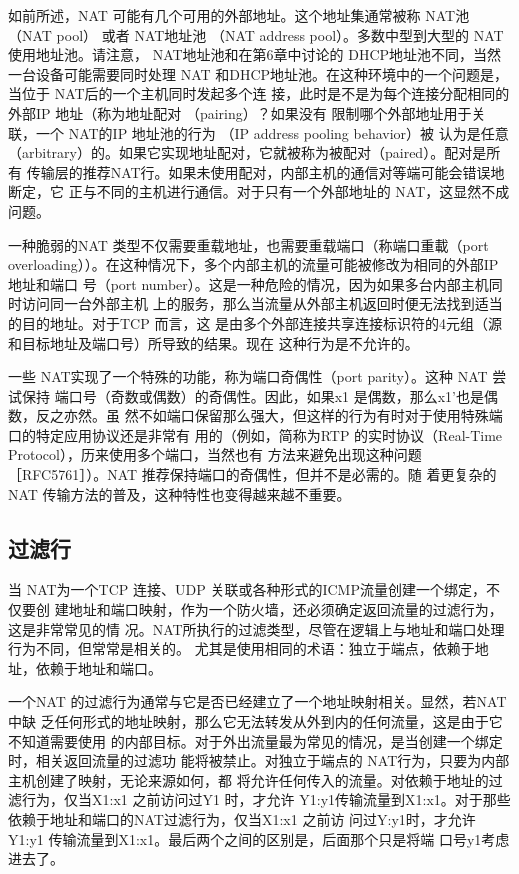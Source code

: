 如前所述，NAT 可能有几个可用的外部地址。这个地址集通常被称 NAT池（NAT
pool） 或者 NAT地址池 （NAT address pool）。多数中型到大型的 NAT 使用地址池。请注意，
NAT地址池和在第6章中讨论的 DHCP地址池不同，当然一台设备可能需要同时处理 NAT
和DHCP地址池。在这种环境中的一个问题是，当位于 NAT后的一个主机同时发起多个连
接，此时是不是为每个连接分配相同的外部IP 地址（称为地址配对 （pairing）？如果没有
限制哪个外部地址用于关联，一个 NAT的IP 地址池的行为 （IP address pooling behavior）被
认为是任意（arbitrary）的。如果它实现地址配对，它就被称为被配对（paired）。配对是所有
传输层的推荐NAT行。如果未使用配对，内部主机的通信对等端可能会错误地断定，它
正与不同的主机进行通信。对于只有一个外部地址的 NAT，这显然不成问题。

一种脆弱的NAT 类型不仅需要重载地址，也需要重载端口（称端口重載（port
overloading））。在这种情况下，多个内部主机的流量可能被修改为相同的外部IP地址和端口
号（port number）。这是一种危险的情况，因为如果多台内部主机同时访问同一台外部主机
上的服务，那么当流量从外部主机返回时便无法找到适当的目的地址。对于TCP 而言，这
是由多个外部连接共享连接标识符的4元组（源和目标地址及端口号）所导致的结果。现在
这种行为是不允许的。

一些 NAT实现了一个特殊的功能，称为端口奇偶性（port parity）。这种 NAT 尝试保持
端口号（奇数或偶数）的奇偶性。因此，如果x1 是偶数，那么x1'也是偶数，反之亦然。虽
然不如端口保留那么强大，但这样的行为有时对于使用特殊端口的特定应用协议还是非常有
用的（例如，简称为RTP 的实时协议（Real-Time Protocol），历来使用多个端口，当然也有
方法来避免出现这种问题［RFC5761］）。NAT 推荐保持端口的奇偶性，但并不是必需的。随
着更复杂的 NAT 传输方法的普及，这种特性也变得越来越不重要。

\subsection{过滤行}

当 NAT为一个TCP 连接、UDP 关联或各种形式的ICMP流量创建一个绑定，不仅要创
建地址和端口映射，作为一个防火墙，还必须确定返回流量的过滤行为，这是非常常见的情
况。NAT所执行的过滤类型，尽管在逻辑上与地址和端口处理行为不同，但常常是相关的。
尤其是使用相同的术语：独立于端点，依赖于地址，依赖于地址和端口。

一个NAT 的过滤行为通常与它是否已经建立了一个地址映射相关。显然，若NAT 中缺
乏任何形式的地址映射，那么它无法转发从外到内的任何流量，这是由于它不知道需要使用
的内部目标。对于外出流量最为常见的情况，是当创建一个绑定时，相关返回流量的过滤功
能将被禁止。对独立于端点的 NAT行为，只要为内部主机创建了映射，无论来源如何，都
将允许任何传入的流量。对依赖于地址的过滤行为，仅当X1:x1 之前访问过Y1 时，才允许
Y1:y1传输流量到X1:x1。对于那些依赖于地址和端口的NAT过滤行为，仅当X1:x1 之前访
问过Y:y1时，才允许 Y1:y1 传输流量到X1:x1。最后两个之间的区别是，后面那个只是将端
口号y1考虑进去了。

